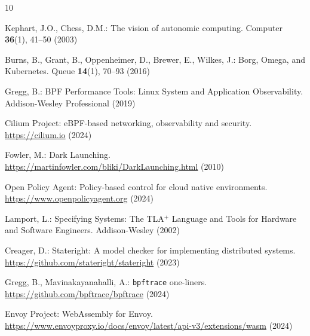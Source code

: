 \documentclass[runningheads]{llncs}
\begin{document}

\begin{thebibliography}{10}

Kephart, J.O., Chess, D.M.: The vision of autonomic computing.
Computer \textbf{36}(1), 41--50 (2003)

Burns, B., Grant, B., Oppenheimer, D., Brewer, E., Wilkes, J.:
Borg, Omega, and Kubernetes. Queue \textbf{14}(1), 70--93 (2016)

Gregg, B.: BPF Performance Tools: Linux System and Application
Observability. Addison-Wesley Professional (2019)

Cilium Project: eBPF-based networking, observability and security.
\url{https://cilium.io} (2024)

Fowler, M.: Dark Launching.
\url{https://martinfowler.com/bliki/DarkLaunching.html} (2010)

Open Policy Agent: Policy-based control for cloud native environments.
\url{https://www.openpolicyagent.org} (2024)

Lamport, L.: Specifying Systems: The TLA\(^+\) Language and Tools
for Hardware and Software Engineers. Addison-Wesley (2002)

Creager, D.: Stateright: A model checker for implementing distributed systems.
\url{https://github.com/stateright/stateright} (2023)

Gregg, B., Mavinakayanahalli, A.: \texttt{bpftrace} one-liners.
\url{https://github.com/bpftrace/bpftrace} (2024)

Envoy Project: WebAssembly for Envoy.
\url{https://www.envoyproxy.io/docs/envoy/latest/api-v3/extensions/wasm} (2024)

\end{thebibliography}
\end{document}
